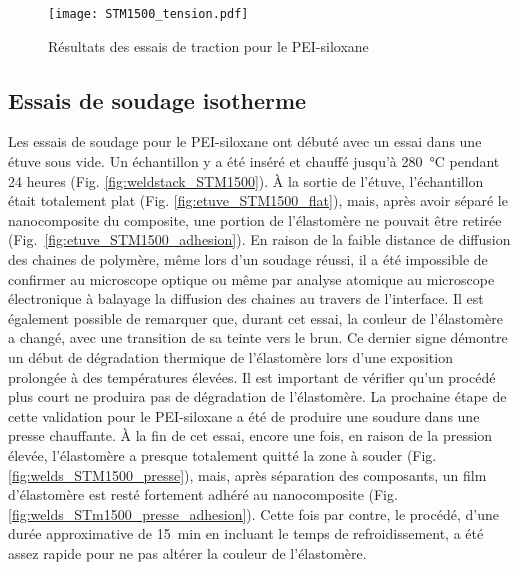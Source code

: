 \begin{figure}[h]
	\centering
	\texttt{[image: STM1500\_tension.pdf]}
	\caption{Résultats des essais de traction pour le PEI-siloxane}
	\label{fig:STM1500_tension}
\end{figure}

\FloatBarrier
\subsection{Essais de soudage isotherme}

Les essais de soudage pour le PEI-siloxane ont débuté avec un essai dans une étuve sous vide. 
Un échantillon y a été inséré et chauffé jusqu'à \SI[locale=FR]{280}{\celsius} pendant 24 heures (Fig. \ref{fig:weldstack_STM1500}). 
À la sortie de l'étuve, l'échantillon était totalement plat (Fig. \ref{fig:etuve_STM1500_flat}), mais, après avoir séparé le nanocomposite du composite, une portion de l'élastomère ne pouvait être retirée (Fig.~\ref{fig:etuve_STM1500_adhesion}). 
En raison de la faible distance de diffusion des chaines de polymère, même lors d'un soudage réussi, il a été impossible de confirmer au microscope optique ou même par analyse atomique au microscope électronique à balayage la diffusion des chaines au travers de l'interface. 
Il est également possible de remarquer que, durant cet essai, la couleur de l'élastomère a changé, avec une transition de sa teinte vers le brun.  
Ce dernier signe démontre un début de dégradation thermique de l'élastomère lors d'une exposition prolongée à des températures élevées. 
Il est important de vérifier qu'un procédé plus court ne produira pas de dégradation de l'élastomère. 
La prochaine étape de cette validation pour le PEI-siloxane a été de produire une soudure dans une presse chauffante. 
À la fin de cet essai, encore une fois, en raison de la pression élevée, l'élastomère a presque totalement quitté la zone à souder (Fig. \ref{fig:welds_STM1500_presse}), mais, après séparation des composants, un film d'élastomère est resté fortement adhéré au nanocomposite (Fig. \ref{fig:welds_STm1500_presse_adhesion}). 
Cette fois par contre, le procédé, d'une durée approximative de \SI[locale=FR]{15}{\minute} en incluant le temps de refroidissement, a été assez rapide pour ne pas altérer la couleur de l'élastomère. 

